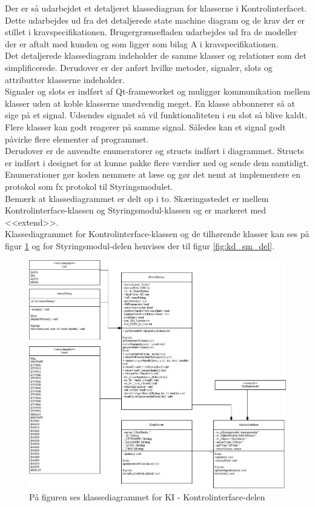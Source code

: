 Der er så udarbejdet et detaljeret klassediagram for klasserne i Kontrolinterfacet. Dette udarbejdes ud fra det detaljerede state machine diagram og de krav der er stillet i kravspecifikationen. Brugergrænsefladen udarbejdes ud fra de modeller der er aftalt med kunden og som ligger som bilag A i kravspecifikationen.\\
Det detaljerede klassediagram indeholder de samme klasser og relationer som det simplificerede. Derudover er der anført hvilke metoder, signaler, slots og attributter klasserne indeholder. \\
Signaler og slots er indført af Qt-frameworket og muliggør kommunikation mellem klasser uden at koble klasserne unødvendig meget. En klasse abbonnerer så at sige på et signal. Udsendes signalet så vil funktionaliteten i en slot så blive kaldt. Flere klasser kan godt reagerer på samme signal. Således kan et signal godt påvirke flere elementer af programmet.\\
Derudover er de anvendte enumeratorer og structs indført i diagrammet. Structs er indført i designet for at kunne pakke flere værdier ned og sende dem samtidigt. Enumerationer gør koden nemmere at læse og gør det nemt at implementere en protokol som fx protokol til Styringsmodulet.\\
Bemærk at klassediagrammet er delt op i to. Skæringsstedet er mellem Kontrolinterface-klassen og Styringsmodul-klassen og er markeret med <<extend>>.\\
Klassediagrammet for Kontrolinterface-klassen og de tilhørende klasser kan ses på figur \ref{fig:kd_ki_del} og for Styringsmodul-delen henvises der til figur \ref{fig:kd_sm_del}.

\begin{figure}[H]
\centering
\includegraphics[width=1\textwidth]{billeder/KI-Class}
\caption{På figuren ses klassediagrammet for KI - Kontrolinterface-delen}
\label{fig:kd_ki_del}
\end{figure}

